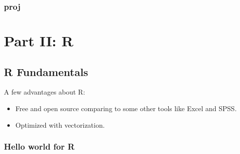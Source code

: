 \documentclass[
]{book}
\providecommand{\tightlist}{%
  \setlength{\itemsep}{0pt}\setlength{\parskip}{0pt}}
\begin{document}
\hypertarget{proj-2}{%
\section{proj}\label{proj-2}}

\hypertarget{part-part-ii-r}{%
\part*{Part II: R}\label{part-part-ii-r}}

\hypertarget{r-fundamentals}{%
\chapter{R Fundamentals}\label{r-fundamentals}}

\citet{Wic2017}

A few advantages about R:

\begin{itemize}
\tightlist
\item
  Free and open source comparing to some other tools like Excel and SPSS.
\item
  Optimized with vectorization.
\end{itemize}

\hypertarget{hello-world-for-r}{%
\section{Hello world for R}\label{hello-world-for-r}}

  
\end{document}
